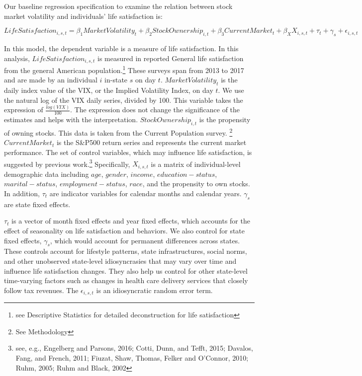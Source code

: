 \documentclass[11pt,a4paper,oldfontcommands]{memoir}
\begin{document}
{Our baseline regression specification to examine the relation between stock market volatility and individuals' life satisfaction is:

\begin{footnotesize}
\begin{equation*}
LifeSatisfaction_{i,s,t}=\beta_1MarketVolatility_t + \beta_2StockOwnership_{i,t} + \beta_3CurrentMarket_t+\beta_XX_{i,s,t}+\tau_t+\gamma_s+\epsilon_{i,s,t}
\end{equation*}
\end{footnotesize}

In this model, the dependent variable is a measure of life satisfaction. In this analysis, $LifeSatisfaction_{i,s,t}$ is measured in reported General life satisfaction from the general American population.\footnote{see Descriptive Statistics for detailed deconstruction for life satisfaction} These surveys span from 2013 to 2017 and are made by an individual $i$ in-state $s$ on day $t$. $MarketVolatility_t$ is the daily index value of the VIX, or the Implied Volatility Index, on day $t$. We use the natural log of the VIX daily series, divided by 100. This variable takes the expression of $\frac{log(VIX)}{100}$. The expression does not change the significance of the estimates and helps with the interpretation. $StockOwnership_{i,t}$ is the propensity of owning stocks. This data is taken from the Current Population survey. \footnote{See Methodology} $CurrentMarket_t$ is the S&P500 return series and represents the current market performance. The set of control variables, which may influence life satisfaction, is suggested by previous work.\footnote{see, e.g., Engelberg and Parsons, 2016; Cotti, Dunn, and Tefft, 2015; Davalos, Fang, and French, 2011; Fiuzat, Shaw, Thomas, Felker and O'Connor, 2010; Ruhm, 2005; Ruhm and Black, 2002} Specifically, $X_{i,s,t}$  is a matrix of individual-level demographic data including $age$, $gender$, $income$, $education-status$, $marital-status$, $employment-status$, $race$, and the propensity to own stocks. In addition, $\tau_t$ are indicator variables for calendar months and calendar years. $\gamma_s$ are state fixed effects. 

$\tau_t$ is a vector of month fixed effects and year fixed effects, which accounts for the effect of seasonality on life satisfaction and behaviors. We also control for state fixed effects, $\gamma_s$, which would account for permanent differences across states. These controls account for lifestyle patterns, state infrastructures, social norms, and other unobserved state-level idiosyncrasies that may vary over time and influence life satisfaction changes. They also help us control for other state-level time-varying factors such as changes in health care delivery services that closely follow tax revenues. The $\epsilon_{i,s,t}$ is an idiosyncratic random error term.

}
\end{document}
